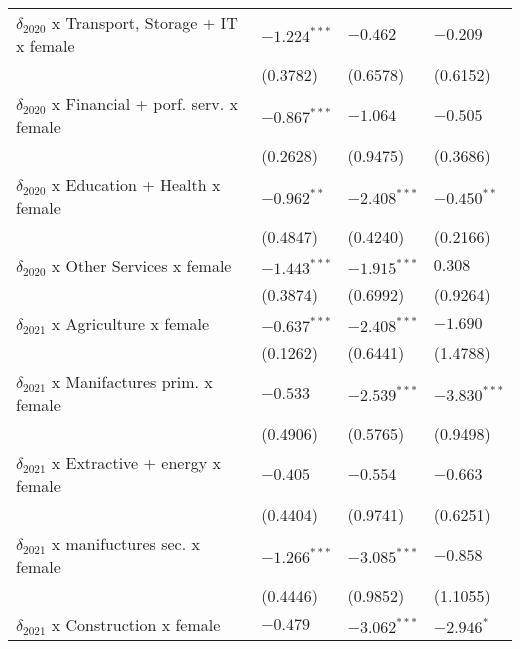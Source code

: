 \begin{tabular}{llll}
$\delta_{2020}$ x Transport, Storage + IT x female &     $-1.224^{***}$ &           $-0.462$ &           $-0.209$ \\
                                                   &           (0.3782) &           (0.6578) &           (0.6152) \\
$\delta_{2020}$ x Financial + porf. serv. x female &     $-0.867^{***}$ &           $-1.064$ &           $-0.505$ \\
                                                   &           (0.2628) &           (0.9475) &           (0.3686) \\
$\delta_{2020}$ x Education + Health x female      &      $-0.962^{**}$ &     $-2.408^{***}$ &      $-0.450^{**}$ \\
                                                   &           (0.4847) &           (0.4240) &           (0.2166) \\
$\delta_{2020}$ x Other Services x female          &     $-1.443^{***}$ &     $-1.915^{***}$ &            $0.308$ \\
                                                   &           (0.3874) &           (0.6992) &           (0.9264) \\
$\delta_{2021}$ x Agriculture x female             &     $-0.637^{***}$ &     $-2.408^{***}$ &           $-1.690$ \\
                                                   &           (0.1262) &           (0.6441) &           (1.4788) \\
$\delta_{2021}$ x Manifactures prim. x female      &           $-0.533$ &     $-2.539^{***}$ &     $-3.830^{***}$ \\
                                                   &           (0.4906) &           (0.5765) &           (0.9498) \\
$\delta_{2021}$ x Extractive + energy x female     &           $-0.405$ &           $-0.554$ &           $-0.663$ \\
                                                   &           (0.4404) &           (0.9741) &           (0.6251) \\
$\delta_{2021}$ x manifuctures sec. x female       &     $-1.266^{***}$ &     $-3.085^{***}$ &           $-0.858$ \\
                                                   &           (0.4446) &           (0.9852) &           (1.1055) \\
$\delta_{2021}$ x Construction x female            &           $-0.479$ &     $-3.062^{***}$ &         $-2.946^*$ \\

\end{tabular}
